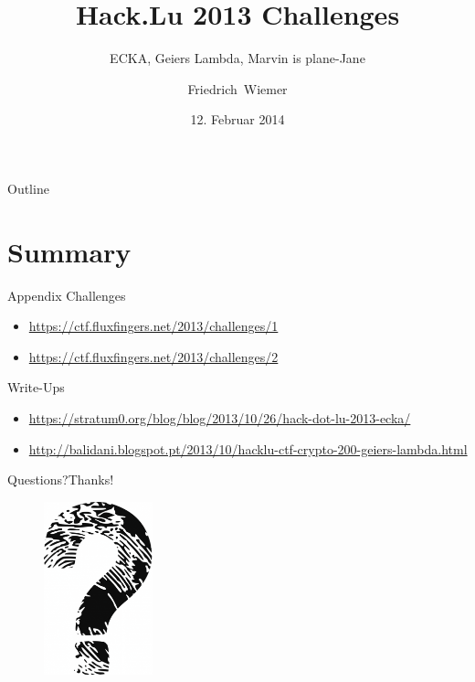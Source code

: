 \documentclass{beamer}
\title{Hack.Lu 2013 Challenges}
\subtitle{ECKA, Geiers Lambda, Marvin is plane-Jane}
\author{Friedrich~Wiemer}
\institute[Ruhr Universit\"at Bochum]
{%
  FluxFingers\\
  Ruhr Universit\"at Bochum
}
\date{12. Februar 2014}
\begin{document}
\begin{frame}
    \titlepage{}
\end{frame}

\begin{frame}{Outline}
  \tableofcontents
\end{frame}



%

\section*{Summary}
\begin{frame}{Appendix}
    Challenges
    \begin{small} \begin{itemize}
        \item \url{https://ctf.fluxfingers.net/2013/challenges/1}
        \item \url{https://ctf.fluxfingers.net/2013/challenges/2}
    \end{itemize} \end{small}

    Write-Ups
    \begin{small} \begin{itemize}
        \item \url{https://stratum0.org/blog/blog/2013/10/26/hack-dot-lu-2013-ecka/}
        \item \url{http://balidani.blogspot.pt/2013/10/hacklu-ctf-crypto-200-geiers-lambda.html}
    \end{itemize} \end{small}
\end{frame}

\begin{frame}{Questions?}{Thanks!}
    \begin{figure}[!htb]
        \includegraphics[height=50mm]{data/questions.png}
    \end{figure}
\end{frame}
\end{document}

